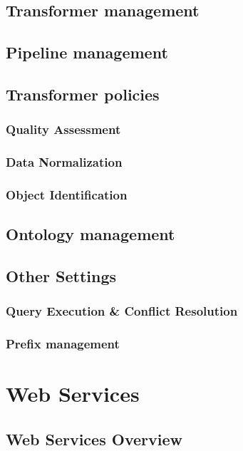 \section{Transformer management}

\section{Pipeline management}

\section{Transformer policies}

\subsection*{Quality Assessment}

\subsection*{Data Normalization}

\subsection*{Object Identification}

\section{Ontology management}

\section{Other Settings}

\subsection*{Query Execution \& Conflict Resolution}

\subsection*{Prefix management}

\chapter{Web Services}

\section{Web Services Overview}

